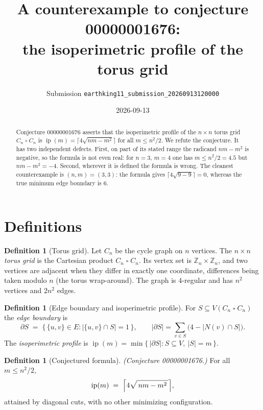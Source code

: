 \documentclass[11pt]{article}
\title{A counterexample to conjecture 00000001676:\\ the isoperimetric profile of the torus grid}
\author{Submission \texttt{earthking11\_submission\_20260913120000}}
\date{2026-09-13}
\theoremstyle{definition}
\newtheorem{definition}[theorem]{Definition}
\begin{document}
\maketitle

\begin{abstract}
Conjecture 00000001676 asserts that the isoperimetric profile of the
$n\times n$ torus grid $C_n \mathbin{\square} C_n$ is
$\operatorname{ip}(m)=\lceil 4\sqrt{nm-m^2}\rceil$ for all $m\le n^2/2$.
We refute the conjecture. It has two independent defects. First, on part of
its stated range the radicand $nm-m^2$ is negative, so the formula is not even
real: for $n=3$, $m=4$ one has $m\le n^2/2=4.5$ but $nm-m^2=-4$. Second,
wherever it is defined the formula is wrong. The cleanest counterexample is
$(n,m)=(3,3)$: the formula gives $\lceil 4\sqrt{9-9}\rceil=0$, whereas the true
minimum edge boundary is $6$.
\end{abstract}

\section{Definitions}

\begin{definition}[Torus grid]
Let $C_n$ be the cycle graph on $n$ vertices. The \emph{$n\times n$ torus grid}
is the Cartesian product $C_n \mathbin{\square} C_n$. Its vertex set is
$\mathbb{Z}_n\times\mathbb{Z}_n$, and two vertices are adjacent when they differ
in exactly one coordinate, differences being taken modulo $n$ (the torus
wrap-around). The graph is $4$-regular and has $n^2$ vertices and $2n^2$ edges.
\end{definition}

\begin{definition}[Edge boundary and isoperimetric profile]
For $S\subseteq V(C_n\mathbin{\square} C_n)$ the \emph{edge boundary} is
\[
  \partial S \;=\; \bigl\{\, \{u,v\}\in E : |\{u,v\}\cap S|=1 \,\bigr\},
  \qquad
  |\partial S|
  = \sum_{v\in S}\bigl(4-|N(v)\cap S|\bigr).
\]
The \emph{isoperimetric profile} is
$\operatorname{ip}(m)=\min\{\,|\partial S| : S\subseteq V,\ |S|=m\,\}$.
\end{definition}

\begin{definition}[Conjectured formula]\label{def:formula}
\emph{(Conjecture 00000001676.)} For all $m\le n^2/2$,
\[
  \operatorname{ip}(m) \;=\; \Bigl\lceil 4\sqrt{\,nm-m^{2}\,}\Bigr\rceil ,
\]
attained by diagonal cuts, with no other minimizing configuration.
\end{definition}
\end{document}
